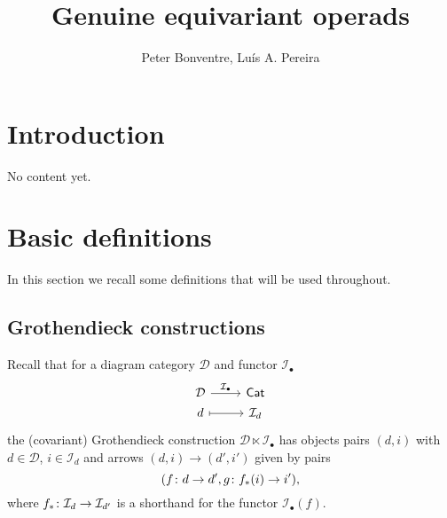 \documentclass[a4paper,10pt]{article}%
\author{Peter Bonventre, Lu\'is A. Pereira}%
\title{Genuine equivariant operads}%
\begin{document}
	\maketitle%



\tableofcontents

\section{Introduction}

No content yet.



\section{Basic definitions}

In this section we recall some definitions that will be used throughout.


\subsection{Grothendieck constructions}


Recall that for a diagram category $\mathcal{D}$ and functor $\mathcal{I}_{\bullet}$
\begin{equation}
  \begin{tikzcd}[row sep = 0.2em]
    \mathcal{D} \ar{r}{\mathcal{I}_{\bullet}} & \mathsf{Cat} \\
    d \ar[mapsto]{r} & \mathcal{I}_d
  \end{tikzcd}
\end{equation}
the (covariant) Grothendieck construction 
$\mathcal{D} \ltimes \mathcal{I}_{\bullet}$
has objects pairs $(d,i)$ with $d \in \mathcal{D}$,
$i \in \mathcal{I}_d$ and 
arrows $(d,i) \to (d',i')$ given by pairs
\[(f\colon d \to d', g \colon f_{\**}(i) \to i'),\]
where $f_{\**}\colon \mathcal{I}_d \to \mathcal{I}_{d'}$ is a shorthand for the functor $\mathcal{I}_{\bullet}(f)$.
\end{document}

